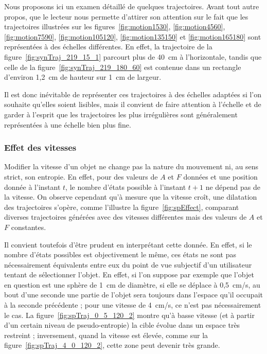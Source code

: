 	Nous proposons ici un examen détaillé de quelques trajectoires. Avant tout autre propos, que le lecteur nous permette d'attirer son attention sur le fait que les trajectoires illustrées sur les figures~\ref{fig:motion1530}, \ref{fig:motion4560}, \ref{fig:motion7590}, \ref{fig:motion105120}, \ref{fig:motion135150} et \ref{fig:motion165180} sont représentées à des échelles différentes. En effet, la trajectoire de la figure~\ref{fig:synTraj_219_15_1} parcourt plus de 40~cm à l'horizontale, tandis que celle de la figure~\ref{fig:synTraj_219_180_60} est contenue dans un rectangle d'environ 1,2~cm de hauteur sur 1~cm de largeur.
	
	Il est donc inévitable de représenter ces trajectoires à des échelles adaptées si l'on souhaite qu'elles soient lisibles, mais il convient de faire attention à l'échelle et de garder à l'esprit que les trajectoires les plus irrégulières sont généralement représentées à une échelle bien plus fine.
	
	\subsubsection{Effet des vitesses}
	Modifier la vitesse d'un objet ne change pas la \og nature \fg{} du mouvement ni, au sens strict, son entropie. En effet, pour des valeurs de $A$ et $F$ données et une position donnée à l'instant $t$, le nombre d'états possible à l'instant $t+1$ ne dépend pas de la vitesse. On observe cependant qu'à mesure que la vitesse croît, une \og dilatation \fg{} des trajectoires s'opère, comme l'illustre la figure~\ref{fig:spEffect}, comparant diverses trajectoires générées avec des vitesses différentes mais des valeurs de $A$ et $F$ constantes.
	
	Il convient toutefois d'être prudent en interprétant cette donnée. En effet, si le nombre d'états possibles est objectivement le même, ces états ne sont pas nécessairement équivalents entre eux du point de vue subjectif d'un utilisateur tentant de sélectionner l'objet. En effet, si l'on suppose par exemple que l'objet en question est une sphère de 1~cm de diamètre, si elle se déplace à 0,5~cm/s, au bout d'une seconde une partie de l'objet sera toujours dans l'espace qu'il occupait à la seconde précédente ; pour une vitesse de 4~cm/s, ce n'est pas nécessairement le cas. La figure~\ref{fig:spTraj_0_5_120_2} montre qu'à basse vitesse (et à partir d'un certain niveau de pseudo-entropie) la cible évolue dans un espace très restreint ; inversement, quand la vitesse est élevée, comme sur la figure~\ref{fig:spTraj_4_0_120_2}, cette zone peut devenir très grande.
	
